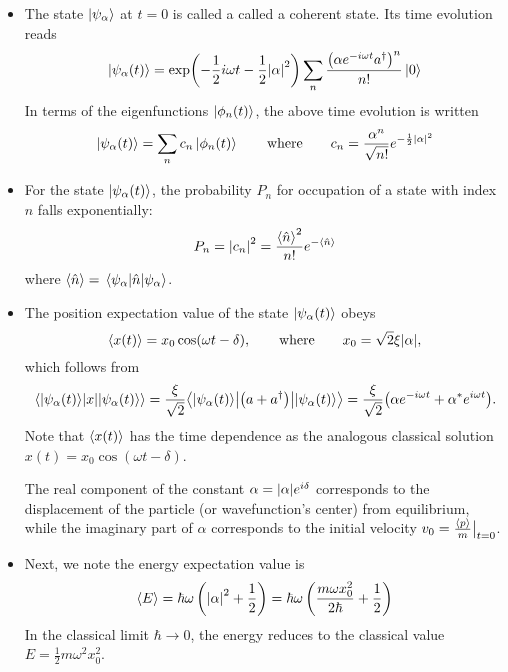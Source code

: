\documentclass[11pt, a4paper]{article}
\newcommand{\eqtext}[1]{\qquad \text{#1} \qquad}
\newcommand{\p}{\psi}  %
\newcommand{\bmel}[3]{\big \langle {#1} \big | {#2} \big | {#3} \big \rangle}  %
\renewcommand{\k}[1]{\ket{#1}}
\begin{document}
\begin{itemize}
	\item The state $ \ket{\p_{\alpha}} $ at $ t = 0 $ is called a called a coherent state. Its time evolution reads
	\begin{equation*}
		\k{\p_{\alpha}(t)} = \exp(-\frac{1}{2}i\omega t - \frac{1}{2}\abs{\alpha}^{2}) \sum_{n} \frac{\big(\alpha e^{-i\omega t}a^{\dagger}\big)^{n}}{n!}\ket{0}
	\end{equation*}
	In terms of the eigenfunctions $ \ket{\phi_{n}(t)} $, the above time evolution is written
	\begin{equation*}
		\k{\p_{\alpha}(t)} = \sum_{n}c_{n}\k{\phi_{n}(t)} \eqtext{where} c_{n} = \frac{\alpha^{n}}{\sqrt{n!}}e^{-\frac{1}{2}\abs{\alpha}^{2}}
	\end{equation*}
	
	\item For the state $ \ket{\p_{\alpha}(t)} $, the probability $ P_{n} $ for occupation of a state with index $ n $ falls exponentially:
	\begin{equation*}
		P_{n} = \abs{c_{n}}^{2} = \frac{\ev{\hat{n}}^{2}}{n!}e^{-\ev{\hat{n}}}
	\end{equation*}
	where $ \ev{\hat{n}} = \mel{\p_{\alpha}}{\hat{n}}{\p_{\alpha}} $. 
	
	\item The position expectation value of the state $ \ket{\p_{\alpha}(t)} $ obeys
	\begin{equation*}
		\ev{x(t)} = x_{0}\cos(\omega t - \delta), \eqtext{where} x_{0} = \sqrt{2}\xi \abs{\alpha},
	\end{equation*}
	which follows from
	\begin{equation*}
		\mel{\ket{\p_{\alpha}(t)}}{x}{\ket{\p_{\alpha}(t)}} = \frac{\xi}{\sqrt{2}} \bmel{\ket{\p_{\alpha}(t)}}{\big(a + a^{\dagger}\big)}{\ket{\p_{\alpha}(t)}} = \frac{\xi}{\sqrt{2}} \big(\alpha e^{-i\omega t} + \alpha^{*}e^{i\omega t}\big).
	\end{equation*}
	Note that $ \ev{x(t)} $ has the time dependence as the analogous classical solution $ x(t) = x_{0}\cos(\omega t - \delta) $.
	
	The real component of the constant $ \alpha = \abs{\alpha}e^{i\delta} $ corresponds to the displacement of the particle (or wavefunction's center)  from equilibrium, while the imaginary part of $ \alpha $ corresponds to the initial velocity $ v_{0} = \frac{\ev{p}}{m}\big|_{t = 0} $.
	
	\item Next, we note the energy expectation value is
	\begin{equation*}
		\ev{E} = \hbar \omega\left(\abs{\alpha}^{2} +  \frac{1}{2}\right) = \hbar \omega \left(\frac{m\omega x_{0}^{2}}{2\hbar} + \frac{1}{2}\right)
	\end{equation*}
	In the classical limit $ \hbar \to 0 $, the energy reduces to the classical value $ E = \frac{1}{2}m\omega^{2}x_{0}^{2} $. 
	

\end{itemize}
\end{document}
